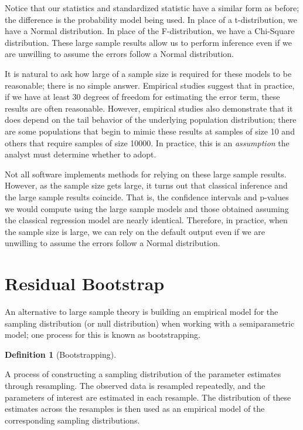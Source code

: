 \documentclass[
  letterpaper,
  DIV=11,
  numbers=noendperiod]{scrreprt}
\theoremstyle{definition}
\theoremstyle{definition}
\newtheorem{definition}{Definition}[chapter]
\theoremstyle{remark}
\begin{document}
Notice that our statistics and standardized statistic have a similar
form as before; the difference is the probability model being used. In
place of a t-distribution, we have a Normal distribution. In place of
the F-distribution, we have a Chi-Square distribution. These large
sample results allow us to perform inference even if we are unwilling to
assume the errors follow a Normal distribution.

It is natural to ask how large of a sample size is required for these
models to be reasonable; there is no simple answer. Empirical studies
suggest that in practice, if we have at least 30 degrees of freedom for
estimating the error term, these results are often reasonable. However,
empirical studies also demonstrate that it does depend on the tail
behavior of the underlying population distribution; there are some
populations that begin to mimic these results at samples of size 10 and
others that require samples of size 10000. In practice, this is an
\emph{assumption} the analyst must determine whether to adopt.

Not all software implements methods for relying on these large sample
results. However, as the sample size gets large, it turns out that
classical inference and the large sample results coincide. That is, the
confidence intervals and p-values we would compute using the large
sample models and those obtained assuming the classical regression model
are nearly identical. Therefore, in practice, when the sample size is
large, we can rely on the default output even if we are unwilling to
assume the errors follow a Normal distribution.

\hypertarget{residual-bootstrap}{%
\section{Residual Bootstrap}\label{residual-bootstrap}}

An alternative to large sample theory is building an empirical model for
the sampling distribution (or null distribution) when working with a
semiparametric model; one process for this is known as bootstrapping.

\begin{definition}[Bootstrapping]\protect\hypertarget{def-bootstrapping}{}\label{def-bootstrapping}

A process of constructing a sampling distribution of the parameter
estimates through resampling. The observed data is resampled repeatedly,
and the parameters of interest are estimated in each resample. The
distribution of these estimates across the resamples is then used as an
empirical model of the corresponding sampling distributions.

\end{definition}
\end{document}
